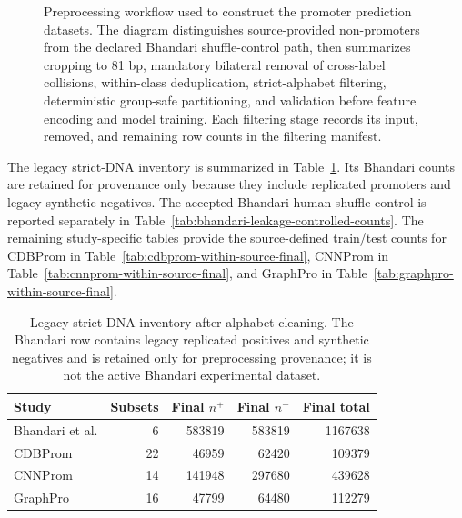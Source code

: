 \begin{figure}[htbp]
\caption{Preprocessing workflow used to construct the promoter prediction datasets. The diagram distinguishes source-provided non-promoters from the declared Bhandari shuffle-control path, then summarizes cropping to 81 bp, mandatory bilateral removal of cross-label collisions, within-class deduplication, strict-alphabet filtering, deterministic group-safe partitioning, and validation before feature encoding and model training. Each filtering stage records its input, removed, and remaining row counts in the filtering manifest.}
\label{fig:within-source-preprocessing-workflow}
\end{figure}


The legacy strict-DNA inventory is summarized in
Table~\ref{tab:within-source-final-summary}. Its Bhandari counts are retained for
provenance only because they include replicated promoters and legacy synthetic
negatives. The accepted Bhandari human shuffle-control is reported separately
in Table~\ref{tab:bhandari-leakage-controlled-counts}. The remaining
study-specific tables provide the source-defined train/test counts for CDBProm
in Table~\ref{tab:cdbprom-within-source-final}, CNNProm in
Table~\ref{tab:cnnprom-within-source-final}, and GraphPro in
Table~\ref{tab:graphpro-within-source-final}.

\begin{table}[htbp]
\centering
\caption{Legacy strict-DNA inventory after alphabet cleaning. The Bhandari row contains legacy replicated positives and synthetic negatives and is retained only for preprocessing provenance; it is not the active Bhandari experimental dataset.}
\label{tab:within-source-final-summary}
\begin{tabular}{lrrrr}
\hline
Study & Subsets & Final $n^{+}$ & Final $n^{-}$ & Final total \\
\hline
Bhandari et al. & 6 & 583819 & 583819 & 1167638 \\
CDBProm & 22 & 46959 & 62420 & 109379 \\
CNNProm & 14 & 141948 & 297680 & 439628 \\
GraphPro & 16 & 47799 & 64480 & 112279 \\
\hline
\end{tabular}
\end{table}

